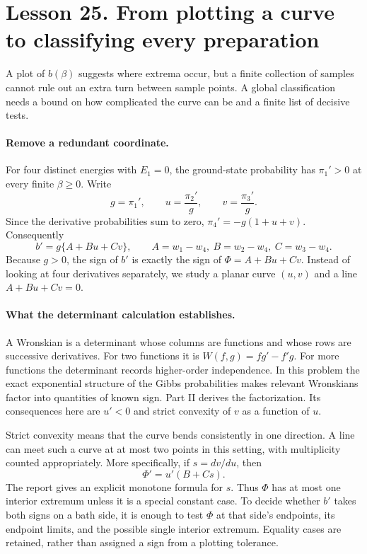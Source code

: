 \clearpage
\section*{Lesson 25. From plotting a curve to classifying every preparation}
A plot of $b(\beta)$ suggests where extrema occur, but a finite collection
of samples cannot rule out an extra turn between sample points. A global
classification needs a bound on how complicated the curve can be and a
finite list of decisive tests.

\paragraph{Remove a redundant coordinate.}
For four distinct energies with $E_1=0$, the ground-state probability has
$\pi_1'>0$ at every finite $\beta\geq0$. Write
\[
g=\pi_1',\qquad u=\frac{\pi_2'}g,\qquad
v=\frac{\pi_3'}g.
\]
Since the derivative probabilities sum to zero,
$\pi_4'=-g(1+u+v)$. Consequently
\[
b'=g\{A+Bu+Cv\},\qquad
A=w_1-w_4,\ B=w_2-w_4,\ C=w_3-w_4.
\]
Because $g>0$, the sign of $b'$ is exactly the sign of
$\Phi=A+Bu+Cv$. Instead of looking at four derivatives separately, we
study a planar curve $(u,v)$ and a line $A+Bu+Cv=0$.

\paragraph{What the determinant calculation establishes.}
A Wronskian is a determinant whose columns are functions and whose rows
are successive derivatives. For two functions it is
$W(f,g)=fg'-f'g$. For more functions the determinant records higher-order
independence. In this problem the exact exponential structure of the
Gibbs probabilities makes relevant Wronskians factor into quantities of
known sign. Part II derives the factorization. Its consequences here are
$u'<0$ and strict convexity of $v$ as a function of $u$.

Strict convexity means that the curve bends consistently in one direction.
A line can meet such a curve at at most two points in this setting, with
multiplicity counted appropriately. More specifically, if
$s=dv/du$, then
\[
\Phi'=u'(B+Cs).
\]
The report gives an explicit monotone formula for $s$. Thus $\Phi$ has at
most one interior extremum unless it is a special constant case. To decide
whether $b'$ takes both signs on a bath side, it is enough to test $\Phi$
at that side's endpoints, its endpoint limits, and the possible single
interior extremum. Equality cases are retained, rather than assigned a
sign from a plotting tolerance.

